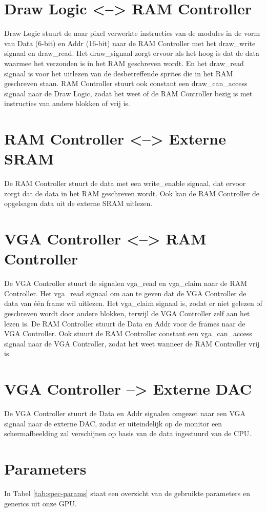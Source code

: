 \documentclass{scrartcl} %
\begin{document}
\section {Draw Logic <--> RAM Controller}
Draw Logic stuurt de naar pixel verwerkte instructies van de modules in de vorm van Data (6-bit) en Addr (16-bit) naar de RAM Controller met het draw\_write signaal en draw\_read. Het draw\_signaal zorgt ervoor als het hoog is dat de data waarmee het verzonden is in het RAM geschreven wordt. En het draw\_read signaal is voor het uitlezen van de desbetreffende sprites die in het RAM geschreven staan.
RAM Controller stuurt ook constant een draw\_can\_access signaal naar de Draw Logic, zodat het weet of de RAM Controller bezig is met instructies van andere blokken of vrij is.

\section{RAM Controller <--> Externe SRAM}
De RAM Controller stuurt de data met een write\_enable signaal, dat ervoor zorgt dat de data in het RAM geschreven wordt. Ook kan de RAM Controller de opgelsagen data uit de externe SRAM uitlezen.

\section{VGA Controller <--> RAM Controller}
De VGA Controller stuurt de signalen vga\_read en vga\_claim naar de RAM Controller. Het vga\_read signaal om aan te geven dat de VGA Controller de data van één frame wil uitlezen. Het vga\_claim signaal is, zodat er niet gelezen of geschreven wordt door andere blokken, terwijl de VGA Controller zelf aan het lezen is.
De RAM Controller stuurt de Data en Addr voor de frames naar de VGA Controller. Ook stuurt de RAM Controller constant een vga\_can\_access signaal naar de VGA Controller, zodat het weet wanneer de RAM Controller vrij is.

\section{VGA Controller --> Externe DAC}
De VGA Controller stuurt de Data en Addr signalen omgezet naar een VGA signaal naar de externe DAC, zodat er uiteindelijk op de monitor een schermafbeelding zal verschijnen op basis van de data ingestuurd van de CPU. 


\section{Parameters} 
In Tabel \ref{tab:spec-params} staat een overzicht van de gebruikte parameters en generics uit onze GPU.
\end{document}
